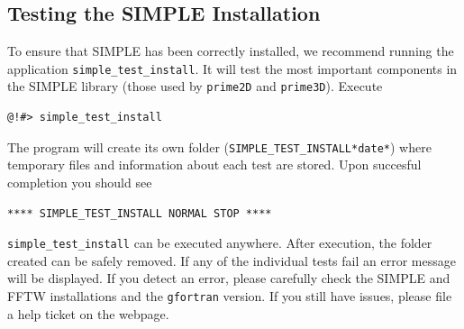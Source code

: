 \documentclass[a4paper,11pt]{article}
\newcommand{\prgname}[1]{\textcolor{NavyBlue}{\texttt{#1}}}
\begin{document}
\subsection{Testing the SIMPLE Installation}
To ensure that SIMPLE has been correctly installed, we recommend running the application \prgname{simple\_test\_install}. It will test the most important components in the SIMPLE library  (those used by \prgname{prime2D} and \prgname{prime3D}). Execute
\begin{verbatim}
@!#> simple_test_install 
\end{verbatim}
The program will create its own folder (\texttt{SIMPLE\_TEST\_INSTALL*date*}) where temporary files and information about each test are stored. Upon succesful completion you should see
\begin{verbatim}
**** SIMPLE_TEST_INSTALL NORMAL STOP ****
\end{verbatim}
\prgname{simple\_test\_install} can be executed anywhere. After execution, the folder created can be safely removed. If any of the individual tests fail an error message will be displayed. If you detect an error, please carefully check the SIMPLE and FFTW installations and the \texttt{gfortran} version. If you still have issues, please file a help ticket on the webpage.
\end{document}
